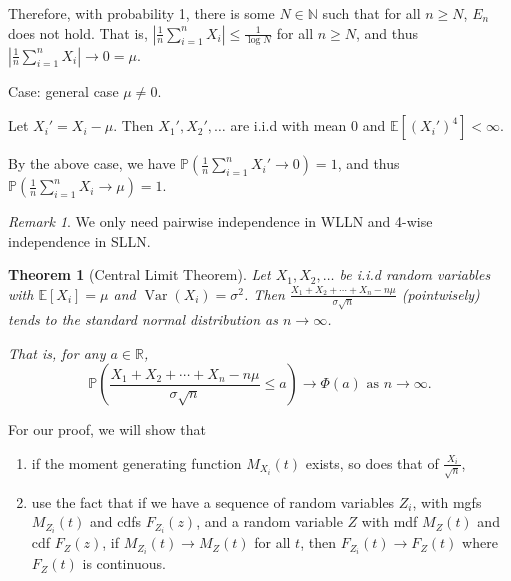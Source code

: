 \documentclass[a4paper,11pt]{amsbook}
\makeatletter
\renewenvironment{proof}[1][\proofname]{\par
    \pushQED{\qed}%
    \normalfont \topsep6\p@\@plus6\p@\relax
    \trivlist
    \itemindent\z@ %
    \item[\hskip\labelsep
          \scshape
      #1\@addpunct{.}]\ignorespaces
}{%
    \popQED\endtrivlist\@endpefalse
}
\newtheorem{theorem}{\hspace{-2em} \color{darkblue} Theorem}[chapter]
\theoremstyle{definition}
\theoremstyle{remark}
\newtheorem{remark}{\hspace{-2em} \color{darkblue} Remark}[chapter]
\newcommand{\R}{\mathbb{R}}
\newcommand{\N}{\mathbb{N}}
\newcommand{\E}{\mathbb{E}}
\renewcommand{\P}{\mathbb{P}}
\DeclareMathOperator\Var{Var}
\newcommand{\abs}[1]{\left|#1\right|}
\newcommand\0{\varnothing}
\makeatother
\begin{document}
\begin{proof}
    Therefore, with probability 1, there is some $N\in\N$ such that for all $n\geq N$, $E_n$ does not hold.
    That is, $\abs{\frac{1}{n}\sum_{i=1}^{n}X_i}\leq\frac{1}{\log N}$ for all $n\geq N$,
    and thus $\abs{\frac{1}{n}\sum_{i=1}^{n}X_i}\to 0=\mu$.

    Case: general case $\mu\neq0$.

    Let $X_i'=X_i-\mu$. Then $X_1',X_2',\ldots$ are i.i.d with mean 0 and $\E[(X_i')^4]<\infty$.

    By the above case, we have $\P\left(\frac{1}{n}\sum_{i=1}^{n}X_i'\to0\right)=1$,
    and thus $\P\left(\frac{1}{n}\sum_{i=1}^{n}X_i\to\mu\right)=1$.
\end{proof}

\begin{remark}
    We only need pairwise independence in WLLN and 4-wise independence in SLLN.
\end{remark}

\begin{theorem}[Central Limit Theorem]
    Let $X_1,X_2,\ldots$ be i.i.d random variables with $\E[X_i]=\mu$ and $\Var(X_i)=\sigma^2$.
    Then $\frac{X_1+X_2+\cdots+X_n-n\mu}{\sigma\sqrt{n}}$ (pointwisely) tends to the standard normal distribution as $n\to\infty$.

    That is, for any $a\in\R$, $$\P\left(\frac{X_1+X_2+\cdots+X_n-n\mu}{\sigma\sqrt{n}}\leq a\right)\to\Phi(a)\text{ as }n\to\infty.$$
\end{theorem}

For our proof, we will show that \begin{enumerate}
    \item if the moment generating function $M_{X_i}(t)$ exists, so does that of $\frac{X_i}{\sqrt{n}}$,
    \item use the fact that if we have a sequence of random variables $Z_i$, with mgfs $M_{Z_i}(t)$
    and cdfs $F_{Z_i}(z)$, and a random variable $Z$ with mdf $M_Z(t)$ and cdf $F_Z(z)$,
    if $M_{Z_i}(t)\to M_Z(t)$ for all $t$, then $F_{Z_i}(t)\to F_Z(t)$ where $F_Z(t)$ is continuous.
\end{enumerate}
\end{document}
